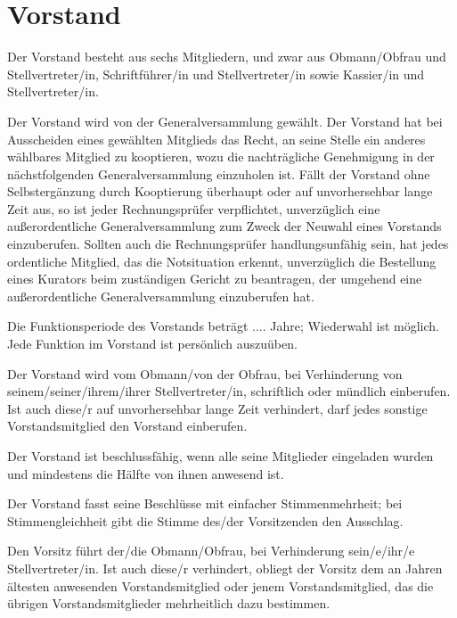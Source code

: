 \documentclass{article}
\begin{document}
\section{Vorstand}\label{vorstand}
\begin{absatz}
    \item Der Vorstand besteht aus sechs Mitgliedern, und zwar aus Obmann/Obfrau und Stellvertreter/in, Schriftführer/in und Stellvertreter/in sowie Kassier/in und Stellvertreter/in.
    \item \label{vorstand-wahl} Der Vorstand wird von der Generalversammlung gewählt. Der Vorstand hat bei Ausscheiden eines gewählten Mitglieds das Recht, an seine Stelle ein anderes wählbares Mitglied zu kooptieren, wozu die nachträgliche Genehmigung in der nächstfolgenden Generalversammlung einzuholen ist. Fällt der Vorstand ohne Selbstergänzung durch Kooptierung überhaupt oder auf unvorhersehbar lange Zeit aus, so ist jeder Rechnungsprüfer verpflichtet, unverzüglich eine außerordentliche Generalversammlung zum Zweck der Neuwahl eines Vorstands einzuberufen. Sollten auch die Rechnungsprüfer handlungsunfähig sein, hat jedes ordentliche Mitglied, das die Notsituation erkennt, unverzüglich die Bestellung eines Kurators beim zuständigen Gericht zu beantragen, der umgehend eine außerordentliche Generalversammlung einzuberufen hat.
    \item \label{vorstand-periode} Die Funktionsperiode des Vorstands beträgt
     ....  Jahre; Wiederwahl ist möglich. Jede Funktion im Vorstand ist persönlich auszuüben.
     \item Der Vorstand wird vom Obmann/von der Obfrau, bei Verhinderung von seinem/seiner/ihrem/ihrer Stellvertreter/in, schriftlich oder mündlich einberufen. Ist auch diese/r auf unvorhersehbar lange Zeit verhindert, darf jedes sonstige Vorstandsmitglied den Vorstand einberufen.
     \item Der Vorstand ist beschlussfähig, wenn alle seine Mitglieder eingeladen wurden und mindestens die Hälfte von ihnen anwesend ist.
     \item Der Vorstand fasst seine Beschlüsse mit einfacher Stimmenmehrheit; bei Stimmengleichheit gibt die Stimme des/der Vorsitzenden den Ausschlag.
     \item Den Vorsitz führt der/die Obmann/Obfrau, bei Verhinderung sein/e/ihr/e Stellvertreter/in. Ist auch diese/r verhindert, obliegt der Vorsitz dem an Jahren ältesten anwesenden Vorstandsmitglied oder jenem Vorstandsmitglied, das die übrigen Vorstandsmitglieder mehrheitlich dazu bestimmen.

\end{absatz}
\end{document}
